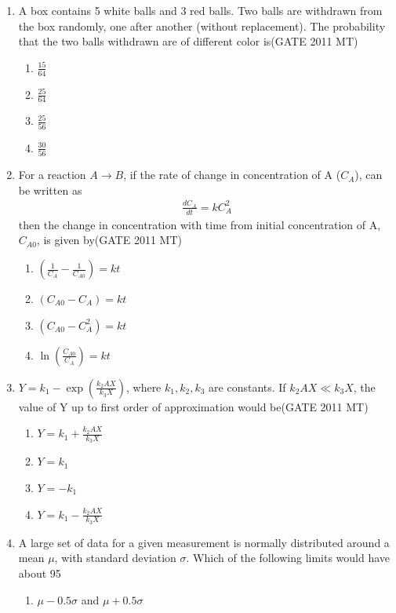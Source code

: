 \documentclass[12pt]{article}
\begin{document}
\begin{enumerate}
\item A box contains 5 white balls and 3 red balls. Two balls are withdrawn from the box randomly, one after another (without replacement). The probability that the two balls withdrawn are of different color is(GATE 2011 MT)
    \begin{enumerate}
        \item \(\frac{15}{64}\)
        \item \(\frac{25}{64}\)
        \item \(\frac{25}{56}\)
        \item \(\frac{30}{56}\)
    \end{enumerate}
\item For a reaction \(A\rightarrow B\), if the rate of change in concentration of A (\(C_A\)), can be written as
\begin{align*}
\frac{dC_A}{dt} = kC_A^2
\end{align*}
then the change in concentration with time from initial concentration of A, \(C_{A0}\), is given by(GATE 2011 MT)
    \begin{enumerate}
        \item \((\frac{1}{C_A} - \frac{1}{C_{A0}}) = kt\)
        \item \((C_{A0} - C_A) = kt\)
        \item \((C_{A0} - C_A^2) = kt\)
        \item \(\ln(\frac{C_{A0}}{C_A}) = kt\)
    \end{enumerate}
\item \(Y = k_1 - \exp{\left(\frac{k_2AX}{k_3X}\right)}\), where \(k_1, k_2, k_3\) are constants. If \(k_2AX \ll k_3X\), the value of Y up to first order of approximation would be(GATE 2011 MT)
    \begin{enumerate}
        \item \(Y = k_1 + \frac{k_2AX}{k_3X}\)
        \item \(Y = k_1\)
        \item \(Y = -k_1\)
        \item \(Y = k_1 - \frac{k_2AX}{k_3X}\)
    \end{enumerate}
\item A large set of data for a given measurement is normally distributed around a mean \(\mu\), with standard deviation \(\sigma\). Which of the following limits would have about 95%
    \begin{enumerate}
        \item \(\mu - 0.5\sigma\) and \(\mu + 0.5\sigma\)

\end{enumerate}
\end{enumerate}
\end{document}
